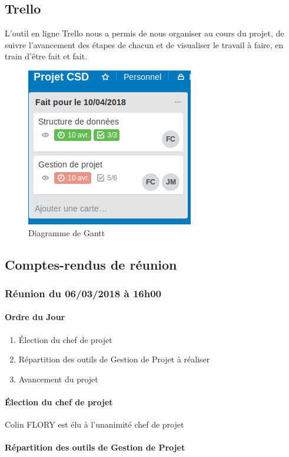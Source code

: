 \documentclass{article}
\begin{document}
\subsection{Trello}
L'outil en ligne Trello nous a permis de nous organiser au cours du projet, de suivre l'avancement des étapes de chacun et de visualiser le travail à faire, en train d'être fait et fait.
\begin{figure}[!h]
    \centering
    \includegraphics[scale=1]{CaptureTrello.png}
    \caption{Diagramme de Gantt}
\end{figure}
\newpage

\subsection{Comptes-rendus de réunion}
\subsubsection*{Réunion du 06/03/2018 à 16h00}
\paragraph*{Ordre du Jour}
\begin{enumerate}
\item Élection du chef de projet
\item Répartition des outils de Gestion de Projet à réaliser
\item Avancement du projet
\end{enumerate}

\paragraph*{Élection du chef de projet}\mbox{}

Colin FLORY est élu à l'unanimité chef de projet
\paragraph*{Répartition des outils de Gestion de Projet}\mbox{}
\end{document}
